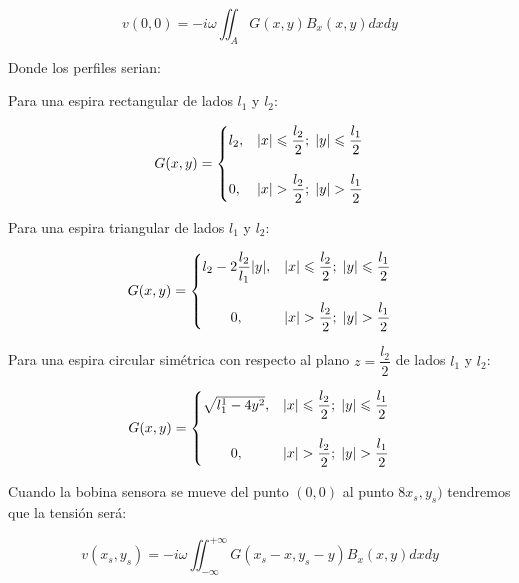\begin{equation}
	\label{eq:537}
	v(0,0) = -i\omega\iint_{A}G(x,y)B_{x}(x,y)dxdy
\end{equation}

Donde los perfiles serian:

Para una espira rectangular de lados $l_{1}$ y $l_{2}$:



\begin{equation}
  G(x,y)=\begin{cases}
  				l_{2}, &\vert x \vert \leqslant \dfrac{l_{2}}{2}; \;  \vert y \vert \leqslant \dfrac{l_{1}}{2}\vspace{0.5cm}\\ 
  				0, &\vert x \vert > \dfrac{l_{2}}{2}; \;  \vert y \vert > \dfrac{l_{1}}{2}
    	\end{cases}
\end{equation}

Para una espira triangular de lados $l_{1}$ y $l_{2}$:

\begin{equation}
  G(x,y)=\begin{cases}
  				l_{2}-2\dfrac{l_{2}}{l_{1}}\vert y \vert, &\vert x \vert \leqslant \dfrac{l_{2}}{2}; \;  \vert y \vert \leqslant \dfrac{l_{1}}{2}\vspace{0.5cm}\\ 
  				\quad \quad 0, &\vert x \vert > \dfrac{l_{2}}{2}; \;  \vert y \vert > \dfrac{l_{1}}{2}
    	\end{cases}
\end{equation}

Para una espira circular simétrica con respecto al plano $z=\dfrac{l_{2}}{2}$ de lados $l_{1}$ y $l_{2}$:

\begin{equation}
  G(x,y)=\begin{cases}
  				\sqrt{l_{1}^{1}-4y^{2}}, &\vert x \vert \leqslant \dfrac{l_{2}}{2}; \;  \vert y \vert \leqslant \dfrac{l_{1}}{2}\vspace{0.5cm}\\ 
  				\quad \quad 0, &\vert x \vert > \dfrac{l_{2}}{2}; \;  \vert y \vert > \dfrac{l_{1}}{2}
    	\end{cases}
\end{equation}


Cuando la bobina sensora se mueve del punto $(0,0)$ al punto $8x_{s}, y_{s})$ tendremos que la tensión será:

\begin{equation}
	\label{eq:538}
	v(x_{s},y_{s}) = -i\omega\iint_{-\infty}^{+\infty}G(x_{s}-x,y_{s}-y)B_{x}(x,y)dxdy
\end{equation}

